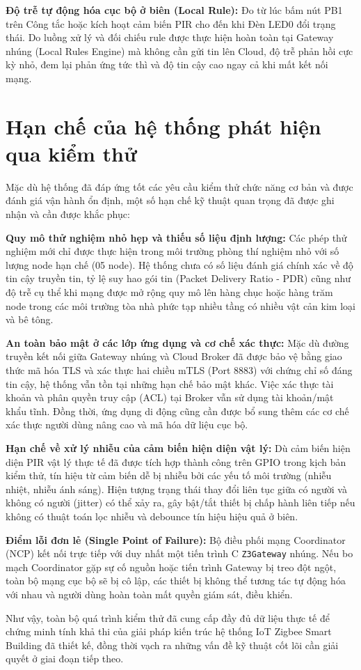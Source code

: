 \textbf{Độ trễ tự động hóa cục bộ ở biên (Local Rule):} Đo từ lúc bấm nút PB1 trên Công tắc hoặc kích hoạt cảm biến PIR cho đến khi Đèn LED0 đổi trạng thái. Do luồng xử lý và đối chiếu rule được thực hiện hoàn toàn tại Gateway nhúng (Local Rules Engine) mà không cần gửi tin lên Cloud, độ trễ phản hồi cực kỳ nhỏ, đem lại phản ứng tức thì và độ tin cậy cao ngay cả khi mất kết nối mạng.

\section{Hạn chế của hệ thống phát hiện qua kiểm thử}
\label{sec:ch5-limitations}

Mặc dù hệ thống đã đáp ứng tốt các yêu cầu kiểm thử chức năng cơ bản và được đánh giá vận hành ổn định, một số hạn chế kỹ thuật quan trọng đã được ghi nhận và cần được khắc phục:

\textbf{Quy mô thử nghiệm nhỏ hẹp và thiếu số liệu định lượng:} Các phép thử nghiệm mới chỉ được thực hiện trong môi trường phòng thí nghiệm nhỏ với số lượng node hạn chế (05 node). Hệ thống chưa có số liệu đánh giá chính xác về độ tin cậy truyền tin, tỷ lệ suy hao gói tin (Packet Delivery Ratio - PDR) cũng như độ trễ cụ thể khi mạng được mở rộng quy mô lên hàng chục hoặc hàng trăm node trong các môi trường tòa nhà phức tạp nhiều tầng có nhiều vật cản kim loại và bê tông.

\textbf{An toàn bảo mật ở các lớp ứng dụng và cơ chế xác thực:} Mặc dù đường truyền kết nối giữa Gateway nhúng và Cloud Broker đã được bảo vệ bằng giao thức mã hóa TLS và xác thực hai chiều mTLS (Port 8883) với chứng chỉ số đáng tin cậy, hệ thống vẫn tồn tại những hạn chế bảo mật khác. Việc xác thực tài khoản và phân quyền truy cập (ACL) tại Broker vẫn sử dụng tài khoản/mật khẩu tĩnh. Đồng thời, ứng dụng di động cũng cần được bổ sung thêm các cơ chế xác thực người dùng nâng cao và mã hóa dữ liệu cục bộ.

\textbf{Hạn chế về xử lý nhiễu của cảm biến hiện diện vật lý:} Dù cảm biến hiện diện PIR vật lý thực tế đã được tích hợp thành công trên GPIO trong kịch bản kiểm thử, tín hiệu từ cảm biến dễ bị nhiễu bởi các yếu tố môi trường (nhiễu nhiệt, nhiễu ánh sáng). Hiện tượng trạng thái thay đổi liên tục giữa có người và không có người (jitter) có thể xảy ra, gây bật/tắt thiết bị chấp hành liên tiếp nếu không có thuật toán lọc nhiễu và debounce tín hiệu hiệu quả ở biên.

\textbf{Điểm lỗi đơn lẻ (Single Point of Failure):} Bộ điều phối mạng Coordinator (NCP) kết nối trực tiếp với duy nhất một tiến trình C \texttt{Z3Gateway} nhúng. Nếu bo mạch Coordinator gặp sự cố nguồn hoặc tiến trình Gateway bị treo đột ngột, toàn bộ mạng cục bộ sẽ bị cô lập, các thiết bị không thể tương tác tự động hóa với nhau và người dùng hoàn toàn mất quyền giám sát, điều khiển.

Như vậy, toàn bộ quá trình kiểm thử đã cung cấp đầy đủ dữ liệu thực tế
để chứng minh tính khả thi của giải pháp kiến trúc hệ thống IoT Zigbee
Smart Building đã thiết kế, đồng thời vạch ra những vấn đề kỹ thuật cốt
lõi cần giải quyết ở giai đoạn tiếp theo.

\newpage
